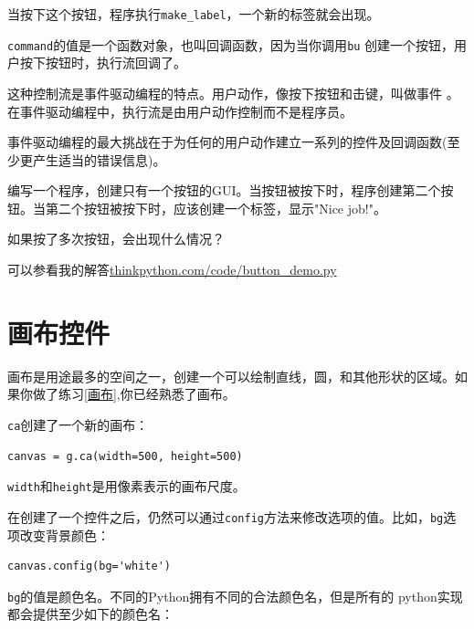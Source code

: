 当按下这个按钮，程序执行\verb"make_label"，一个新的标签就会出现。


{\tt command}的值是一个函数对象，也叫回调函数，因为当你调用{\tt bu}
创建一个按钮，用户按下按钮时，执行流回调了。


这种控制流是事件驱动编程的特点。用户动作，像按下按钮和击键，叫做事件
。在事件驱动编程中，执行流是由用户动作控制而不是程序员。

事件驱动编程的最大挑战在于为任何的用户动作建立一系列的控件及回调函数(至少更产生适当的错误信息)。

\begin{ex}
编写一个程序，创建只有一个按钮的GUI。当按钮被按下时，程序创建第二个按钮。当第二个按钮被按下时，应该创建一个标签，显示"Nice job!"。

如果按了多次按钮，会出现什么情况？

可以参看我的解答\url{thinkpython.com/code/button_demo.py}

\end{ex}


\section{画布控件}


画布是用途最多的空间之一，创建一个可以绘制直线，圆，和其他形状的区域。如果你做了练习\ref{画布},你已经熟悉了画布。

{\tt ca}创建了一个新的画布：

\beforeverb
\begin{verbatim}
canvas = g.ca(width=500, height=500)
\end{verbatim}
\afterverb

{\tt width}和{\tt height}是用像素表示的画布尺度。


在创建了一个控件之后，仍然可以通过{\tt config}方法来修改选项的值。比如，{\tt bg}选项改变背景颜色：

\beforeverb
\begin{verbatim}
canvas.config(bg='white')
\end{verbatim}
\afterverb

{\tt bg}的值是颜色名。不同的Python拥有不同的合法颜色名，但是所有的
python实现都会提供至少如下的颜色名：

